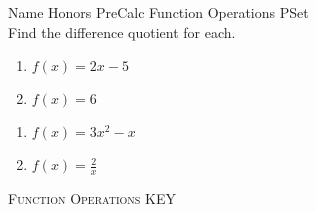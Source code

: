 \documentclass{article}
\newcounter{PS}
\begin{document}
Name \makebox[3in]{\hrulefill} \hfill Honors PreCalc Function Operations PSet   \newline\\
Find the difference quotient for each.
\begin{multicols}{2}
\begin{enumerate}   \setcounter{enumi}{\value{PS}}
    \item $f(x) = 2x-5$
    \item $f(x) = 6$
\setcounter{PS}{\value{enumi}}
\end{enumerate}
\end{multicols}
\vfill
\begin{multicols}{2}
\begin{enumerate}   \setcounter{enumi}{\value{PS}}
    \item $f(x) = 3x^2-x$
    \item $f(x) = \frac{2}{x}$
\end{enumerate}
\end{multicols}
\vfill

\newpage

\textsc{Function Operations KEY}
\end{document}
